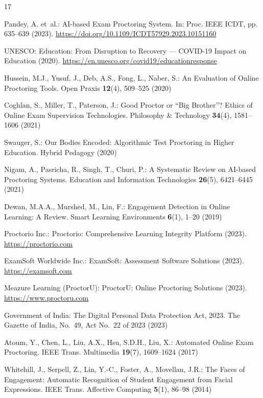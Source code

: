 \documentclass[runningheads]{llncs}
\begin{document}
\begin{thebibliography}{17}

Pandey, A. et~al.: {AI}-based Exam Proctoring System. In: Proc. IEEE ICDT, pp. 635--639 (2023). \url{https://doi.org/10.1109/ICDT57929.2023.10151160}

{UNESCO}: Education: From Disruption to Recovery --- {COVID}-19 Impact on Education (2020). \url{https://en.unesco.org/covid19/educationresponse}

Hussein, M.J., Yusuf, J., Deb, A.S., Fong, L., Naber, S.: An Evaluation of Online Proctoring Tools. Open Praxis \textbf{12}(4), 509--525 (2020)

Coghlan, S., Miller, T., Paterson, J.: Good Proctor or ``Big Brother''? Ethics of Online Exam Supervision Technologies. Philosophy \& Technology \textbf{34}(4), 1581--1606 (2021)

Swauger, S.: Our Bodies Encoded: Algorithmic Test Proctoring in Higher Education. Hybrid Pedagogy (2020)

Nigam, A., Pasricha, R., Singh, T., Churi, P.: A Systematic Review on {AI}-based Proctoring Systems. Education and Information Technologies \textbf{26}(5), 6421--6445 (2021)

Dewan, M.A.A., Murshed, M., Lin, F.: Engagement Detection in Online Learning: A Review. Smart Learning Environments \textbf{6}(1), 1--20 (2019)

{Proctorio Inc.}: Proctorio: Comprehensive Learning Integrity Platform (2023). \url{https://proctorio.com}

{ExamSoft Worldwide Inc.}: {ExamSoft}: Assessment Software Solutions (2023). \url{https://examsoft.com}

{Meazure Learning (ProctorU)}: {ProctorU}: Online Proctoring Solutions (2023). \url{https://www.proctoru.com}

{Government of India}: The Digital Personal Data Protection Act, 2023. The Gazette of India, No.~49, Act No.~22 of 2023 (2023)

Atoum, Y., Chen, L., Liu, A.X., Hsu, S.D.H., Liu, X.: Automated Online Exam Proctoring. IEEE Trans. Multimedia \textbf{19}(7), 1609--1624 (2017)

Whitehill, J., Serpell, Z., Lin, Y.-C., Foster, A., Movellan, J.R.: The Faces of Engagement: Automatic Recognition of Student Engagement from Facial Expressions. IEEE Trans. Affective Computing \textbf{5}(1), 86--98 (2014)


\end{thebibliography}
\end{document}
